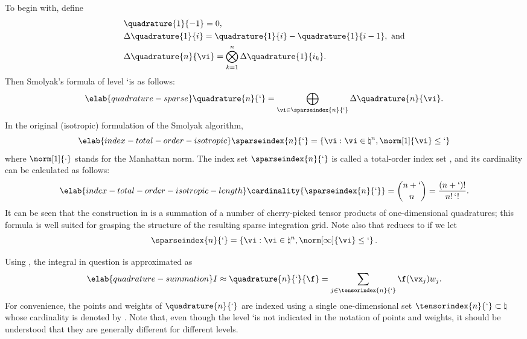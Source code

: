 To begin with, define
\begin{align*}
  & \quadrature{1}{-1} = 0, \\
  & \Delta\quadrature{1}{i} = \quadrature{1}{i} - \quadrature{1}{i - 1}, \text{ and} \\
  & \Delta\quadrature{n}{\vi} = \bigotimes_{k = 1}^n \Delta\quadrature{1}{i_k}.
\end{align*}
Then Smolyak's formula of level \lq is as follows:
\begin{equation} \elab{quadrature-sparse}
  \quadrature{n}{\lq} = \bigoplus_{\vi \in \sparseindex{n}{\lq}} \Delta\quadrature{n}{\vi}.
\end{equation}
In the original (isotropic) formulation of the Smolyak algorithm,
\begin{equation} \elab{index-total-order-isotropic}
  \sparseindex{n}{\lq} = \left\{ \vi: \vi \in \natural^n, \norm[1]{\vi} \leq \lq \right\}
\end{equation}
where $\norm[1]{\cdot}$ stands for the Manhattan norm. The index set
$\sparseindex{n}{\lq}$ is called a total-order index set \cite{eldred2008,
beck2011}, and its cardinality can be calculated as follows:
\begin{equation} \elab{index-total-order-isotropic-length}
  \cardinality{\sparseindex{n}{\lq}} = {n + \lq \choose n} = \frac{(n + \lq)!}{n! \, \lq!}.
\end{equation}
It can be seen that the construction in  is a summation
of a number of cherry-picked tensor products of one-dimensional quadratures;
this formula is well suited for grasping the structure of the resulting sparse
integration grid. Note also that  reduces to
 if we let
\[
  \sparseindex{n}{\lq} = \left\{ \vi: \vi \in \natural^n, \norm[\infty]{\vi} \leq \lq \right\}.
\]

Using , the integral in question is approximated as
\begin{equation} \elab{quadrature-summation}
  I \approx \quadrature{n}{\lq}{\f}
  = \sum_{j \in \tensorindex{n}{\lq}} \f(\vx_j) w_j.
\end{equation}
For convenience, the points and weights of $\quadrature{n}{\lq}$ are indexed
using a single one-dimensional set $\tensorindex{n}{\lq} \subset \natural$ whose
cardinality is denoted by \nq. Note that, even though the level \lq is not
indicated in the notation of points and weights, it should be understood that
they are generally different for different levels.


